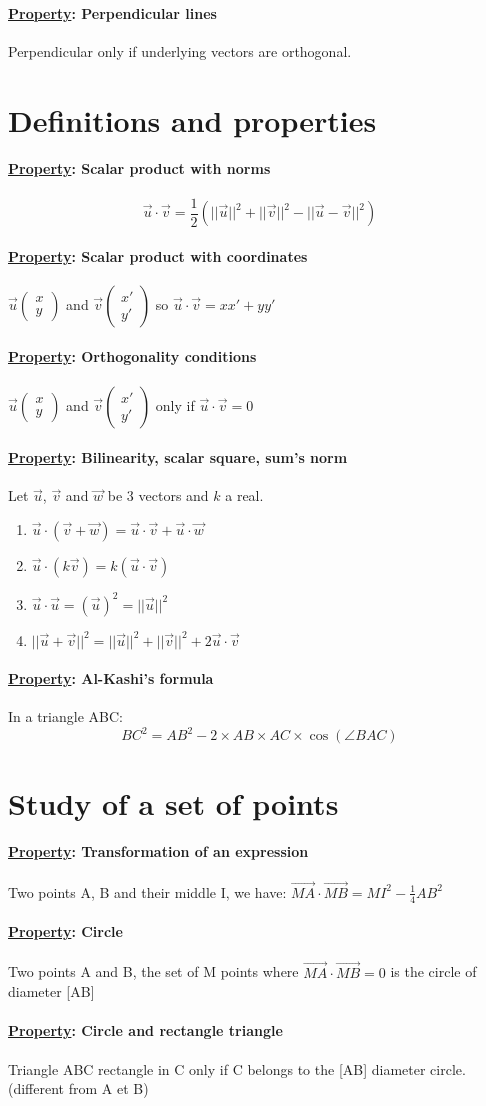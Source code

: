\documentclass{article}
\newcommand{\property}[1]{\paragraph*{\underline{Property}: #1}}
\renewcommand{\vec}[1]{\overrightarrow{#1}}
\newcommand{\scmul}[2]{\vec{#1} \cdot \vec{#2}}
\newcommand{\twodivec}[3]{\vec{#1} \begin{pmatrix}#2 \\ #3\end{pmatrix}}
\begin{document}
\paragraph*{\underline{Property}: Perpendicular lines}
Perpendicular only if underlying vectors are orthogonal.
\section{Definitions and properties}
\property{Scalar product with norms}
$$\vec{u} \cdot \vec{v} = \frac{1}{2}(||\vec{u}||^2 + ||\vec{v}||^2 - ||\vec{u} - \vec{v}||^2)$$
\property{Scalar product with coordinates}
$\vec{u}\begin{pmatrix} x \\ y \end{pmatrix}$ and $\vec{v}\begin{pmatrix} x' \\ y' \end{pmatrix}$ so $\scmul{u}{v} = xx' + yy'$
\property{Orthogonality conditions}
$\twodivec{u}{x}{y}$ and $\twodivec{v}{x'}{y'}$ only if $\scmul{u}{v} = 0$
\property{Bilinearity, scalar square, sum's norm}
Let $\vec{u}$, $\vec{v}$ and $\vec{w}$ be 3 vectors and $k$ a real.
\begin{enumerate}
    \item $\vec{u} \cdot (\vec{v} + \vec{w}) = \scmul{u}{v} + \scmul{u}{w}$
    \item $\vec{u} \cdot (k\vec{v}) = k(\scmul{u}{v})$
    \item $\scmul{u}{u} = (\vec{u})^2 = ||\vec{u}||^2$
    \item $||\vec{u} + \vec{v}||^2 = ||\vec{u}||^2 + ||\vec{v}||^2 + 2\vec{u} \cdot \vec{v}$
\end{enumerate}
\property{Al-Kashi's formula}
In a triangle ABC:
$$BC^2 = AB^2 - 2 \times AB \times AC \times \cos{(\angle{BAC})}$$
\section{Study of a set of points}
\property{Transformation of an expression}
Two points A, B and their middle I, we have: $\scmul{MA}{MB} = MI^2 - \frac{1}{4}AB^2$
\property{Circle}
Two points A and B, the set of M points where $\scmul{MA}{MB} = 0$ is the circle of diameter [AB]
\property{Circle and rectangle triangle}
Triangle ABC rectangle in C only if C belongs to the [AB] diameter circle. (different from A et B)
\end{document}
